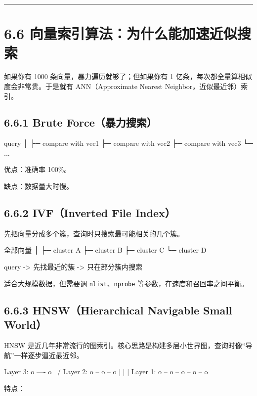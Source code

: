 \bigskip\hrule\bigskip

\section{6.6 向量索引算法：为什么能加速近似搜索}

如果你有 1000 条向量，暴力遍历就够了；但如果你有 1 亿条，每次都全量算相似度会非常贵。于是就有 ANN（Approximate Nearest Neighbor，近似最近邻）索引。


\subsection{6.6.1 Brute Force（暴力搜索）}

\begin{codeblock}
query
  │
  ├─ compare with vec1
  ├─ compare with vec2
  ├─ compare with vec3
  └─ ...
\end{codeblock}

优点：准确率 100\%。

缺点：数据量大时慢。


\subsection{6.6.2 IVF（Inverted File Index）}

先把向量分成多个簇，查询时只搜索最可能相关的几个簇。


\begin{codeblock}
全部向量
   │
   ├─ cluster A
   ├─ cluster B
   ├─ cluster C
   └─ cluster D

query -> 先找最近的簇 -> 只在部分簇内搜索
\end{codeblock}

适合大规模数据，但需要调 \texttt{nlist}、\texttt{nprobe} 等参数，在速度和召回率之间平衡。


\subsection{6.6.3 HNSW（Hierarchical Navigable Small World）}

HNSW 是近几年非常流行的图索引。核心思路是构建多层小世界图，查询时像``导航''一样逐步逼近最近邻。


\begin{codeblock}
Layer 3:   o ---- o
            \    /
Layer 2:   o -- o -- o
           |    |    |
Layer 1: o -- o -- o -- o -- o
\end{codeblock}

特点：


